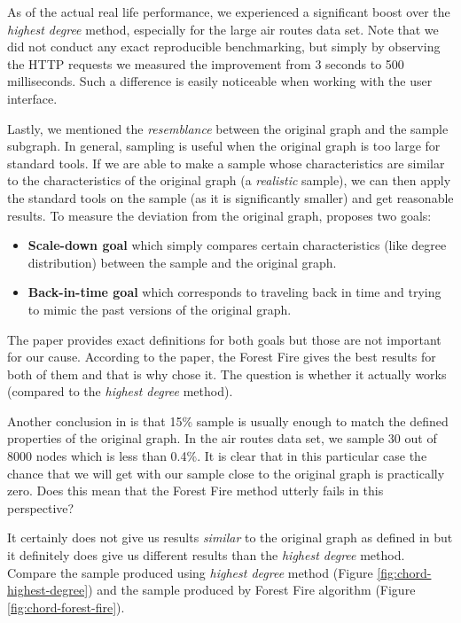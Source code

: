 As of the actual real life performance, we experienced a significant boost over the \emph{highest degree} method, especially for the large air routes data set. Note that we did not conduct any exact reproducible benchmarking, but simply by observing the HTTP requests we measured the improvement from 3 seconds to 500 milliseconds. Such a difference is easily noticeable when working with the user interface.

Lastly, we mentioned the \emph{resemblance} between the original graph and the sample subgraph. In general, sampling is useful when the original graph is too large for standard tools. If we are able to make a sample whose characteristics are similar to the characteristics of the original graph (a \emph{realistic} sample), we can then apply the standard tools on the sample (as it is significantly smaller) and get reasonable results. To measure the deviation from the original graph, \cite{leskovec2006sampling} proposes two goals: 

\begin{itemize}
\item \textbf{Scale-down goal} which simply compares certain characteristics (like degree distribution) between the sample and the original graph.
\item \textbf{Back-in-time goal} which corresponds to traveling back in time and trying to mimic the past versions of the original graph.
\end{itemize}

The paper provides exact definitions for both goals but those are not important for our cause. According to the paper, the Forest Fire gives the best results for both of  them and that is why chose it. The question is whether it actually works (compared to the \emph{highest degree} method).

Another conclusion in \cite{leskovec2006sampling} is that 15\% sample is usually enough to match the defined properties of the original graph. In the air routes data set, we sample 30 out of 8000 nodes which is less than 0.4\%. It is clear that in this particular case the chance that we will get with our sample close to the original graph is practically zero. Does this mean that the Forest Fire method utterly fails in this perspective?

It certainly does not give us results \emph{similar} to the original graph as defined in \cite{leskovec2006sampling} but it definitely does give us different results than the \emph{highest degree} method. Compare the sample produced using \emph{highest degree} method (Figure \ref{fig:chord-highest-degree}) and the sample produced by Forest Fire algorithm (Figure \ref{fig:chord-forest-fire}).

